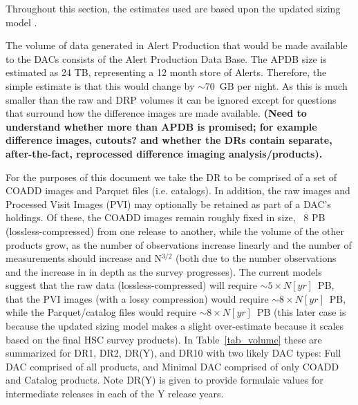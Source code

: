 Throughout this section, the estimates used are based upon the updated sizing model .

The volume of data generated in Alert Production that would be made available to the DACs
consists of the Alert Production Data Base.  The APDB size is estimated as 24 TB, representing
a 12 month store of Alerts.  Therefore, the simple estimate is that this would change by $\sim$70~GB
per night.  As this is much smaller than the raw and DRP volumes it can be ignored except 
for questions that surround how the difference images are made available. {\bf (Need to understand
whether more than APDB is promised; for example difference images, cutouts? and whether the DRs 
contain separate, after-the-fact, reprocessed difference imaging analysis/products).}

For the purposes of this document we take the DR to be comprised of a set of COADD images 
and Parquet files (i.e. catalogs).  In addition, the raw images 
and Processed Visit Images (PVI) may optionally be retained as part of a DAC's holdings.  
Of these, the COADD images remain roughly fixed in size, ~8 PB (lossless-compressed) from 
one release to another, while the volume of the other products grow, as the number of 
observations increase linearly and the number of measurements should increase and N$^{3/2}$ 
(both due to the number observations and the increase in in depth as the survey progresses).  
The current models suggest that the raw data (lossless-compressed) will require 
$\sim 5\times N[yr]$~PB, that the PVI images (with a lossy compression) would require 
$\sim 8\times N[yr]$~PB, while the Parquet/catalog files would require $\sim 8\times N[yr]$~PB 
(this later case is because the updated sizing model makes a slight over-estimate because it 
scales based on the final HSC survey products).  In Table~\ref{tab_volume} these are summarized 
for DR1, DR2, DR(Y), and DR10 with two likely DAC types: Full DAC comprised of all products, 
and Minimal DAC comprised of only COADD and Catalog products.  Note DR(Y) is given to provide 
formulaic values for intermediate releases in each of the Y release years.

